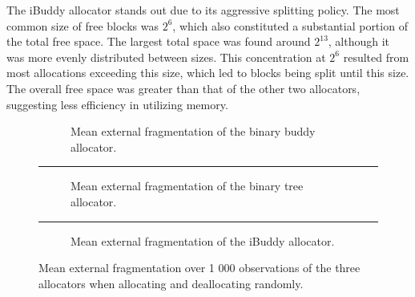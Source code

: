 The iBuddy allocator stands out due to its aggressive splitting policy. The most common size of free blocks was $2^6$, which also constituted a substantial portion of the total free space. The largest total space was found around $2^{13}$, although it was more evenly distributed between sizes. This concentration at $2^6$ resulted from most allocations exceeding this size, which led to blocks being split until this size. The overall free space was greater than that of the other two allocators, suggesting less efficiency in utilizing memory.

%   

%   

%   

\begin{figure}[h]
  \centering
  \begin{subfigure}{\textwidth}
    \centering
    \captionsetup{justification=centering}
    
    \caption{Mean external fragmentation of the binary buddy allocator.}
    \label{fig:fragextbinary}
  \end{subfigure}
  \rule{\textwidth}{0.1pt}
  \begin{subfigure}{\textwidth}
    \centering
    \captionsetup{justification=centering}
    
    \caption{Mean external fragmentation of the binary tree allocator.}
    \label{fig:fragextbt}
  \end{subfigure}
  \rule{\textwidth}{0.1pt}
  \begin{subfigure}{\textwidth}
    \centering
    \captionsetup{justification=centering}
    
    \caption{Mean external fragmentation of the iBuddy allocator.}
    \label{fig:fragextibuddy}
  \end{subfigure}
  \caption{Mean external fragmentation over 1 000 observations of the three allocators when allocating and deallocating randomly.}
  \label{fig:fragext}
\end{figure}

\FloatBarrier
